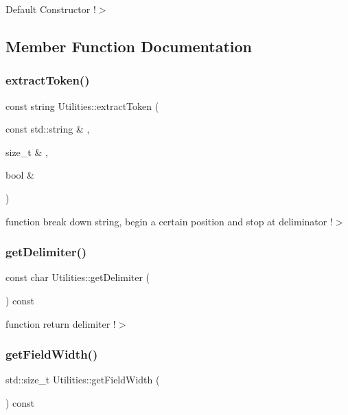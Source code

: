 Default Constructor !$>$ 

\subsection{Member Function Documentation}
\mbox{\label{class_utilities_a965e959066042decc812c4e8b8602a7e}} 
\subsubsection{\texorpdfstring{extract\+Token()}{extractToken()}}
{\footnotesize\ttfamily const string Utilities\+::extract\+Token (\begin{DoxyParamCaption}\item[{const std\+::string \&}]{,  }\item[{size\+\_\+t \&}]{,  }\item[{bool \&}]{ }\end{DoxyParamCaption})}

function break down string, begin a certain position and stop at deliminator !$>$ \mbox{\label{class_utilities_a8335fa01c68450eceb6f409fd6c2469d}} 
\subsubsection{\texorpdfstring{get\+Delimiter()}{getDelimiter()}}
{\footnotesize\ttfamily const char Utilities\+::get\+Delimiter (\begin{DoxyParamCaption}{ }\end{DoxyParamCaption}) const}

function return delimiter !$>$ \mbox{\label{class_utilities_a4d76700f1ca78a0fcac71661ac05a137}} 
\subsubsection{\texorpdfstring{get\+Field\+Width()}{getFieldWidth()}}
{\footnotesize\ttfamily std\+::size\+\_\+t Utilities\+::get\+Field\+Width (\begin{DoxyParamCaption}{ }\end{DoxyParamCaption}) const}

